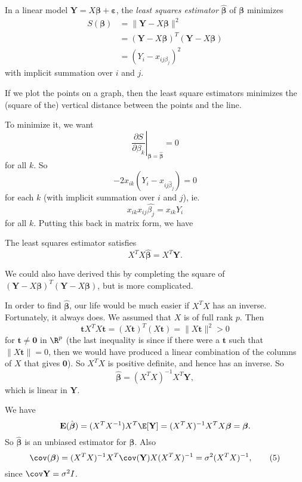 \documentclass[a4paper]{article}
\begin{document}
\begin{defi}
  In a linear model $\mathbf{Y} = X\boldsymbol\beta + \boldsymbol\varepsilon$, the \emph{least squares estimator} $\hat{\boldsymbol\beta}$ of $\boldsymbol\beta$ minimizes
  \begin{align*}
    S(\boldsymbol\beta) &= \|\mathbf{Y} - X\boldsymbol\beta\|^2\\
    &= (\mathbf{Y} - X\boldsymbol\beta)^T(\mathbf{Y} - X\boldsymbol\beta)\\
    &= (Y_i - x_{ij\beta_j})^2
  \end{align*}
  with implicit summation over $i$ and $j$.

  If we plot the points on a graph, then the least square estimators minimizes the (square of the) vertical distance between the points and the line.
\end{defi}

To minimize it, we want
\[
  \left.\frac{\partial S}{\partial \beta_k}\right|_{\boldsymbol\beta = \hat{\boldsymbol\beta}} = 0
\]
for all $k$. So
\[
  -2 x_{ik}(Y_i - x_{ij\hat{\beta}_j}) = 0
\]
for each $k$ (with implicit summation over $i$ and $j$), ie.
\[
  x_{ik}x_{ij}\hat{\beta_j} = x_{ik}Y_i
\]
for all $k$. Putting this back in matrix form, we have
\begin{prop}
  The least squares estimator satisfies
  \[
    X^TX\hat{\boldsymbol\beta} = X^T\mathbf{Y}.\tag{3}
  \]
\end{prop}
We could also have derived this by completing the square of $(\mathbf{Y} - X\boldsymbol\beta)^T(\mathbf{Y} - X\boldsymbol\beta)$, but is more complicated.

In order to find $\hat{\boldsymbol\beta}$, our life would be much easier if $X^TX$ has an inverse. Fortunately, it always does. We assumed that $X$ is of full rank $p$. Then
\[
  \mathbf{t}X^TX\mathbf{t} = (X\mathbf{t})^T(X\mathbf{t}) = \|X\mathbf{t}\|^2 > 0
\]
for $\mathbf{t}\not= \mathbf{0}$ in $\R^p$ (the last inequality is since if there were a $\mathbf{t}$ such that $\|X\mathbf{t}\| = 0$, then we would have produced a linear combination of the columns of $X$ that gives $\mathbf{0}$). So $X^TX$ is positive definite, and hence has an inverse. So
\[
  \hat{\boldsymbol\beta} = (X^TX)^{-1} X^T\mathbf{Y},\tag{4}
\]
which is linear in $\mathbf{Y}$.

We have
\[
  \mathbf{E}(\hat{\boldsymbol\beta}) = (X^TX^{-1})X^T\E[\mathbf{Y}] = (X^TX)^{-1}X^TX\boldsymbol\beta = \boldsymbol\beta.
\]
So $\hat{\boldsymbol\beta}$ is an unbiased estimator for $\boldsymbol\beta$. Also
\[
  \cov(\boldsymbol\beta) = (X^TX)^{-1}X^T \cov(\mathbf{Y})X(X^TX)^{-1} = \sigma^2(X^TX)^{-1} ,\tag{5}
\]
since $\cov \mathbf{Y} = \sigma^2 I$.
\end{document}
